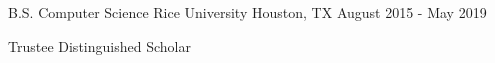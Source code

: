 

\begin{cventries}

  \cventry
    {B.S. Computer Science} %
    {Rice University} %
    {Houston, TX} %
    {August 2015 - May 2019} %
    {
      \begin{cvitems} %
        \item {Trustee Distinguished Scholar}
      \end{cvitems}
    }

\end{cventries}
